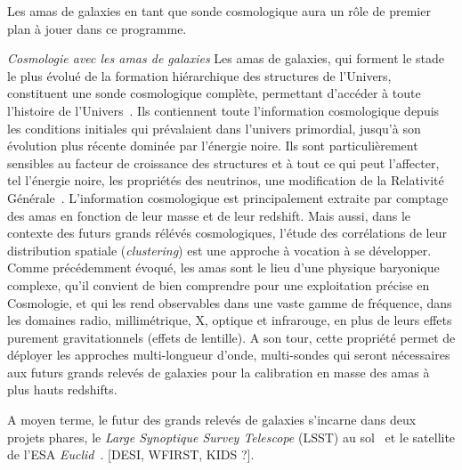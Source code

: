 Les amas de galaxies en tant que sonde cosmologique aura un rôle de
premier plan à jouer dans ce programme. 


\emph{Cosmologie avec les amas de galaxies}
Les amas de galaxies, qui forment le stade le plus évolué
de la formation hiérarchique des structures de l’Univers, constituent
une sonde cosmologique complète, permettant d’accéder à toute l’histoire de
l’Univers~. Ils contiennent toute l’information
cosmologique depuis les conditions initiales qui prévalaient dans
l’univers primordial, jusqu’à son évolution plus récente dominée par
l’énergie noire. Ils sont particulièrement sensibles au facteur de
croissance des structures et à tout ce qui peut l’affecter, tel l'énergie
noire, les propriétés des neutrinos, une modification de la Relativité
Générale~\citep{Haiman2001, Wang2005, Bolliet2019, Mohr2003,
Hagstotz2019}.
L’information cosmologique est principalement extraite par comptage
des amas en fonction de leur masse et de leur redshift. Mais aussi,
dans le contexte des futurs grands rélévés cosmologiques, l’étude des
corrélations de leur distribution spatiale (\emph{clustering}) est une
approche à vocation à se développer.
Comme précédemment évoqué, les amas sont le lieu d’une physique baryonique
complexe, qu’il convient de bien comprendre pour une exploitation
précise en Cosmologie, et qui les rend observables dans une vaste
gamme de fréquence, dans les domaines radio, millimétrique, X, optique
et infrarouge, en plus de leurs effets purement gravitationnels (effets de
lentille). A son tour, cette propriété permet de déployer les
approches multi-longueur d’onde, multi-sondes qui seront nécessaires
aux futurs grands relevés de galaxies pour la calibration en masse des
amas à plus hauts redshifts.




A moyen terme, le futur des grands relevés de galaxies s'incarne dans
deux projets phares, le \emph{Large Synoptique Survey Telescope}
(LSST) au sol~ et le satellite de
l'ESA \emph{Euclid}~. [DESI, WFIRST, KIDS ?]. 

